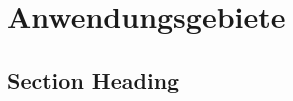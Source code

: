 \chapter{Anwendungsgebiete}
\label{applications} %







\section{Section Heading}


\printbibliography
